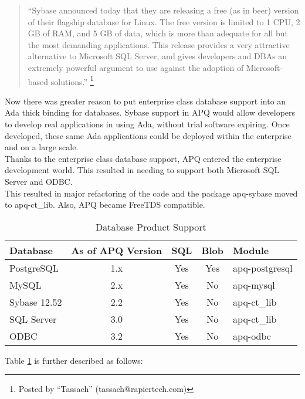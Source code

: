 \documentclass[english,letterpaper]{book}
\begin{document}
\begin{quote}
``Sybase announced today that they are releasing a free (as in
beer) version of their flagship database for Linux. The free version
is limited to 1 CPU, 2 GB of RAM, and 5 GB of data, which is more
than adequate for all but the most demanding applications. This release
provides a very attractive alternative to Microsoft SQL Server, and
gives developers and DBAs an extremely powerful argument to use against
the adoption of Microsoft-based solutions.''%
\footnote{Posted by ``Tassach'' (tassach@rapiertech.com)}
\end{quote}

Now there was greater reason to put enterprise class database support
into an Ada thick binding for databases. Sybase support in APQ would
allow developers to develop real applications in using Ada, without
trial software expiring. Once developed, these same Ada applications
could be deployed within the enterprise and on a large scale.\\

Thanks to the enterprise class database support, APQ entered the
enterprise development world. This resulted in needing to support
both Microsoft SQL Server and
ODBC.\\

This resulted in major refactoring of the code and the package apq-sybase moved
to apq-ct\_lib. Also, APQ became FreeTDS compatible.

\begin{table}{
   \begin{tabular}{lcccl}
   Database       &  As of APQ Version &  SQL   &  Blob &  Module          \\
   \hline
   PostgreSQL     &  1.x               &  Yes   &  Yes  &  apq-postgresql  \\
   MySQL          &  2.x               &  Yes   &  No   &  apq-mysql       \\
   Sybase 12.52   &  2.2               &  Yes   &  No   &  apq-ct\_lib      \\
   SQL Server     &  3.0               &  Yes   &  No   &  apq-ct\_lib      \\
   ODBC           & 3.2                &  Yes   &  No   &  apq-odbc
   \end{tabular}}
   \caption{Database Product Support}\label{t:DBSupport}
\end{table}


Table \ref{t:DBSupport} is further described as follows:
\end{document}
